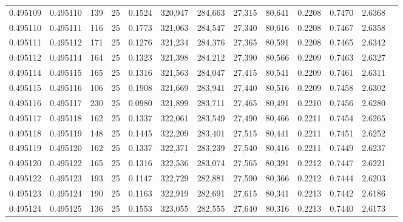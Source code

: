 \begin{tabular}{rrrrrrrrrrrrr}
0.495109 & 0.495110 &   139 &  25 &                                     0.1524 & 320,947 & 284,663 &  27,315 &  80,641 & 0.2208 & 0.7470 & 2.6368 \\
0.495110 & 0.495111 &   116 &  25 &                                     0.1773 & 321,063 & 284,547 &  27,340 &  80,616 & 0.2208 & 0.7467 & 2.6358 \\
0.495111 & 0.495112 &   171 &  25 &                                     0.1276 & 321,234 & 284,376 &  27,365 &  80,591 & 0.2208 & 0.7465 & 2.6342 \\
0.495112 & 0.495114 &   164 &  25 &                                     0.1323 & 321,398 & 284,212 &  27,390 &  80,566 & 0.2209 & 0.7463 & 2.6327 \\
0.495114 & 0.495115 &   165 &  25 &                                     0.1316 & 321,563 & 284,047 &  27,415 &  80,541 & 0.2209 & 0.7461 & 2.6311 \\
0.495115 & 0.495116 &   106 &  25 &                                     0.1908 & 321,669 & 283,941 &  27,440 &  80,516 & 0.2209 & 0.7458 & 2.6302 \\
0.495116 & 0.495117 &   230 &  25 &                                     0.0980 & 321,899 & 283,711 &  27,465 &  80,491 & 0.2210 & 0.7456 & 2.6280 \\
0.495117 & 0.495118 &   162 &  25 &                                     0.1337 & 322,061 & 283,549 &  27,490 &  80,466 & 0.2211 & 0.7454 & 2.6265 \\
0.495118 & 0.495119 &   148 &  25 &                                     0.1445 & 322,209 & 283,401 &  27,515 &  80,441 & 0.2211 & 0.7451 & 2.6252 \\
0.495119 & 0.495120 &   162 &  25 &                                     0.1337 & 322,371 & 283,239 &  27,540 &  80,416 & 0.2211 & 0.7449 & 2.6237 \\
0.495120 & 0.495122 &   165 &  25 &                                     0.1316 & 322,536 & 283,074 &  27,565 &  80,391 & 0.2212 & 0.7447 & 2.6221 \\
0.495122 & 0.495123 &   193 &  25 &                                     0.1147 & 322,729 & 282,881 &  27,590 &  80,366 & 0.2212 & 0.7444 & 2.6203 \\
0.495123 & 0.495124 &   190 &  25 &                                     0.1163 & 322,919 & 282,691 &  27,615 &  80,341 & 0.2213 & 0.7442 & 2.6186 \\
0.495124 & 0.495125 &   136 &  25 &                                     0.1553 & 323,055 & 282,555 &  27,640 &  80,316 & 0.2213 & 0.7440 & 2.6173 \\

\end{tabular}
